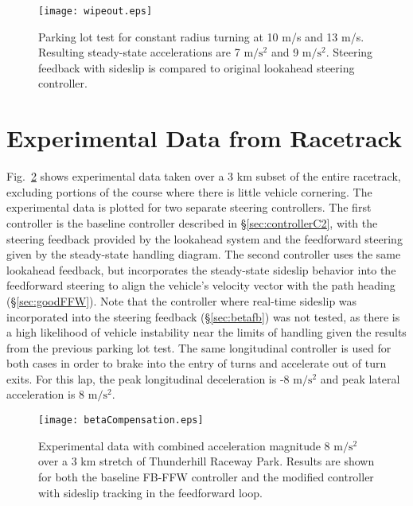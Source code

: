 \begin{figure}
\centering
\texttt{[image: wipeout.eps]}
\caption[Parking lot test for constant radius turning at 10 m/s and 13 m/s.]{Parking lot test for constant radius turning at 10 m/s and 13 m/s. Resulting steady-state accelerations are 7 $\mathrm{m/s^2}$ and 9
$\mathrm{m/s^2}$. Steering feedback with sideslip is compared to original lookahead steering controller.}
\label{fig:wipeout}
\end{figure}


\section{Experimental Data from Racetrack}

Fig.~\ref{fig:betaComparison} shows experimental data taken over a 3 km subset of the entire racetrack,
excluding portions of the course where there is little vehicle cornering. The experimental data is plotted for two separate steering
controllers. The first controller is the baseline controller described in \S \ref{sec:controllerC2}, with the
steering feedback provided by the lookahead system and the feedforward steering given by the steady-state handling diagram. The second controller uses the same lookahead feedback, but incorporates the steady-state sideslip
behavior into the feedforward steering to align the vehicle's velocity vector with the path heading (\S \ref{sec:goodFFW}).
Note that the controller where real-time sideslip was incorporated into the steering feedback (\S \ref{sec:betafb}) was not tested, as there is a high likelihood
of vehicle instability near the limits of handling given the results from the previous parking lot test. The same longitudinal controller is used for both cases in order to
 brake into the entry of turns and accelerate out of turn exits. For this lap, the peak longitudinal deceleration is -8 $\mathrm{m/s^2}$ and
 peak lateral acceleration is 8 $\mathrm{m/s^2}$.
 
\begin{figure}[h!]
\centering
\texttt{[image: betaCompensation.eps]}
\caption{Experimental data with combined acceleration magnitude 8 $\mathrm{m/s^2}$ over a 3 km stretch of Thunderhill Raceway Park. Results are
shown for both the baseline FB-FFW controller and the modified controller with sideslip tracking in the feedforward loop.}
\label{fig:betaComparison}
\end{figure}

